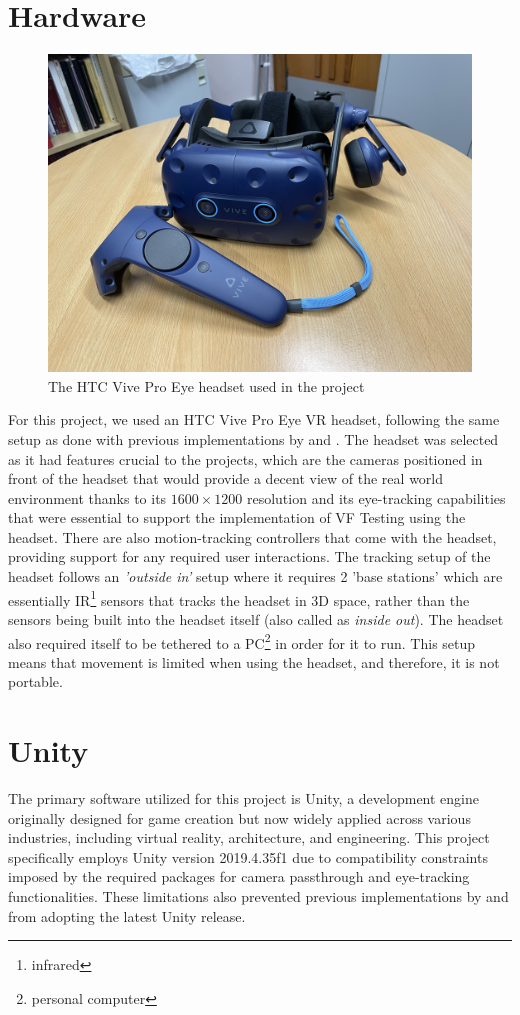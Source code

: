 \documentclass{l4proj}
\begin{document}
\section{Hardware}
\begin{figure}[!h]
    \centering
    \includegraphics[width=0.7\linewidth]{images/HTCVive.jpg}
    \caption{The HTC Vive Pro Eye headset used in the project}
    \label{fig:htc-vive}
\end{figure}
For this project, we used an HTC Vive Pro Eye VR headset, following the same setup as done with previous implementations by \cite{Russell2023} and \cite{Macintosh2024}. The headset was selected as it had features crucial to the projects, which are the cameras positioned in front of the headset that would provide a decent view of the real world environment thanks to its $1600 \times 1200$ resolution and its eye-tracking capabilities that were essential to support the implementation of VF Testing using the headset. There are also motion-tracking controllers that come with the headset, providing support for any required user interactions. The tracking setup of the headset follows an \textit{'outside in'} setup where it requires 2 'base stations' which are essentially IR\footnote{infrared} sensors that tracks the headset in 3D space, rather than the sensors being built into the headset itself (also called as \textit{inside out}). The headset also required itself to be tethered to a PC\footnote{personal computer} in order for it to run. This setup means that movement is limited when using the headset, and therefore, it is not portable.


\section{Unity}
The primary software utilized for this project is Unity, a development engine originally designed for game creation but now widely applied across various industries, including virtual reality, architecture, and engineering. This project specifically employs Unity version 2019.4.35f1 due to compatibility constraints imposed by the required packages for camera passthrough and eye-tracking functionalities. These limitations also prevented previous implementations by \cite{Russell2023} and \cite{Macintosh2024} from adopting the latest Unity release.
\end{document}
